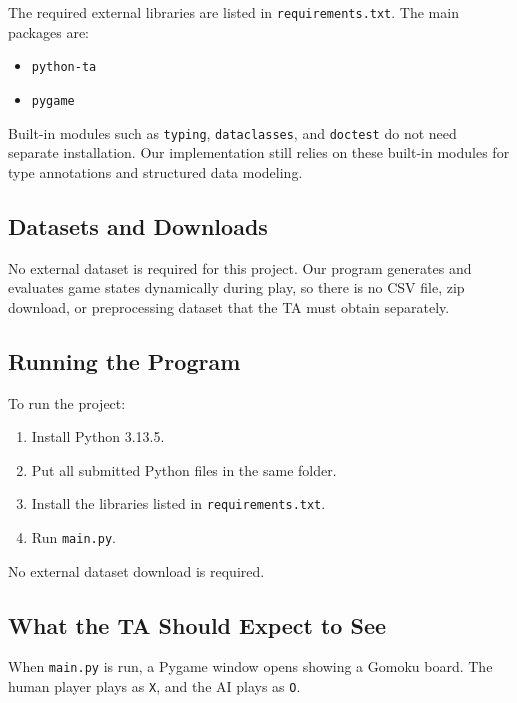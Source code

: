 \documentclass[11pt]{article}
\begin{document}
The required external libraries are listed in \texttt{requirements.txt}. The main packages are:
\begin{itemize}
    \item \texttt{python-ta}
    \item \texttt{pygame}
\end{itemize}

Built-in modules such as \texttt{typing}, \texttt{dataclasses}, and \texttt{doctest} do not need separate installation.
Our implementation still relies on these built-in modules for type annotations and structured data modeling.\cite{python_typing,python_dataclasses}

\subsection*{Datasets and Downloads}

No external dataset is required for this project. Our program generates and evaluates game states dynamically during play, so there is no CSV file, zip download, or preprocessing dataset that the TA must obtain separately.

\subsection*{Running the Program}

To run the project:
\begin{enumerate}
    \item Install Python 3.13.5.
    \item Put all submitted Python files in the same folder.
    \item Install the libraries listed in \texttt{requirements.txt}.
    \item Run \texttt{main.py}.
\end{enumerate}

No external dataset download is required.

\subsection*{What the TA Should Expect to See}

When \texttt{main.py} is run, a Pygame window opens showing a Gomoku board. The human player plays as \texttt{X}, and the AI plays as \texttt{O}.
\end{document}
